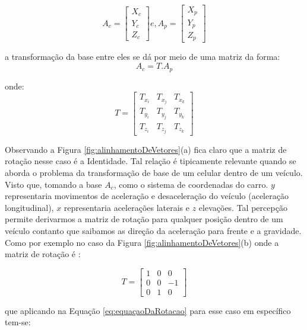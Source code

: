 \begin{equation} 
A_c = 
    \begin{bmatrix}
X_c\\ 
Y_c\\ 
Z_c
\end{bmatrix} e, A_p = 
    \begin{bmatrix}
X_p\\ 
Y_p\\ 
Z_p
\end{bmatrix}
\end{equation}{}

a transformação da base entre eles se dá por meio de uma matriz da forma:
\begin{equation}
    A_c = T . A_p
    \label{eq:equaçaoDaRotacao}
\end{equation}{}

onde:
\begin{equation}
    T = \begin{bmatrix}
T_{x_i} & T_{x_j}  & T_{x_k} \\ 
T_{y_i} & T_{y_j}  & T_{y_k} \\ 
T_{z_i} & T_{z_j}  & T_{z_k}
\end{bmatrix}
\end{equation}{}

Observando a Figura \ref{fig:alinhamentoDeVetores}(a) fica claro que a matriz de rotação nesse caso é a Identidade. Tal relação é tipicamente relevante quando se aborda o problema da transformação de base de um celular dentro de um veículo. Visto que, tomando a base $A_c$, como o sistema de coordenadas do carro. $y$ representaria movimentos de aceleração e desaceleração do veículo (aceleração longitudinal), $x$ representaria acelerações laterais e $z$ elevações. Tal percepção permite derivarmos a matriz de rotação para qualquer posição dentro de um veículo contanto que saibamos as direção da aceleração para frente e a gravidade. Como por exemplo no caso da Figura \ref{fig:alinhamentoDeVetores}(b) onde a matriz de rotação é :

\begin{equation}
    T = \begin{bmatrix}
1 & 0  & 0 \\ 
0 & 0  & -1 \\ 
0 & 1  & 0
\end{bmatrix}
\end{equation}{}

que aplicando na Equação \ref{eq:equaçaoDaRotacao} para esse caso em específico tem-se:

